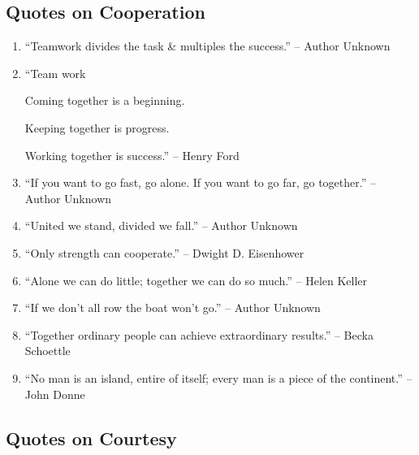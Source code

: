 \documentclass{article}
\begin{document}
\subsection{Quotes on Cooperation}

\begin{enumerate}
	\item ``Teamwork divides the task \& multiples the success.'' -- Author Unknown
	\item ``Team work
	
	Coming together is a beginning.
	
	Keeping together is progress.
	
	Working together is success.'' -- Henry Ford
	\item ``If you want to go fast, go alone. If you want to go far, go together.'' -- Author Unknown
	\item ``United we stand, divided we fall.'' -- Author Unknown
	\item ``Only strength can cooperate.'' -- Dwight D. Eisenhower
	\item ``Alone we can do little; together we can do so much.'' -- Helen Keller
	\item ``If we don't all row the boat won't go.'' -- Author Unknown
	\item ``Together ordinary people can achieve extraordinary results.'' -- Becka Schoettle
	\item ``No man is an island, entire of itself; every man is a piece of the continent.'' -- John Donne
\end{enumerate}

\subsection{Quotes on Courtesy}
\end{document}
